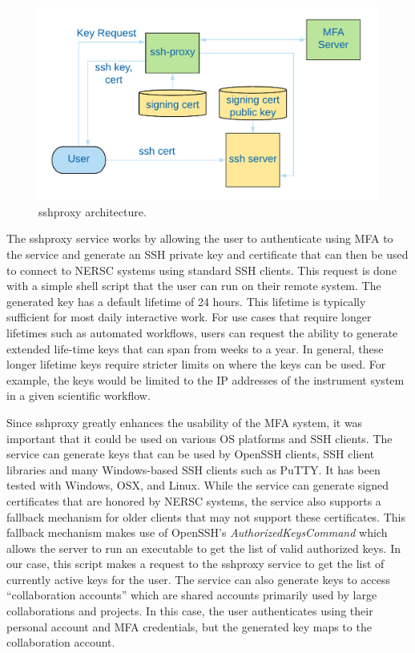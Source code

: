 \documentclass[sigconf,review]{acmart}
\begin{document}
\begin{figure}[h!]
  \centering
  \includegraphics[width=\columnwidth]{sshproxy.png}
  \caption{sshproxy architecture.}
  \label{sshproxy-diagram}
\end{figure}

The sshproxy service works by allowing the user to authenticate using MFA to the
service and generate an SSH private key and certificate \cite{habets2011} that
can then be used to connect to NERSC systems using standard SSH clients.  This
request is done with a simple shell script that the user can run on their remote
system.  The generated key has a default lifetime of 24 hours.  This lifetime is
typically sufficient for most daily interactive work.  For use cases that
require longer lifetimes such as automated workflows, users can request the
ability to generate extended life-time keys that can span from weeks to a year.
In general, these longer lifetime keys require stricter limits on where the keys
can be used.  For example, the keys would be limited to the IP addresses of the
instrument system in a given scientific workflow.

Since sshproxy greatly enhances the usability of the MFA system, it was
important that it could be used on various OS platforms and SSH clients.  The
service can generate keys that can be used by OpenSSH clients, SSH client
libraries and many Windows-based SSH clients such as PuTTY.  It has been tested
with Windows, OSX, and Linux.  While the service can generate signed
certificates that are honored by NERSC systems, the service also supports a
fallback mechanism for older clients that may not support these certificates.
This fallback mechanism makes use of OpenSSH's \textit{AuthorizedKeysCommand}
which allows the server to run an executable to get the list of valid authorized
keys.  In our case, this script makes a request to the sshproxy service to get
the list of currently active keys for the user.  The service can also generate
keys to access ``collaboration accounts'' which are shared accounts primarily
used by large collaborations and projects.  In this case, the user authenticates
using their personal account and MFA credentials, but the generated key maps to
the collaboration account.
\end{document}
